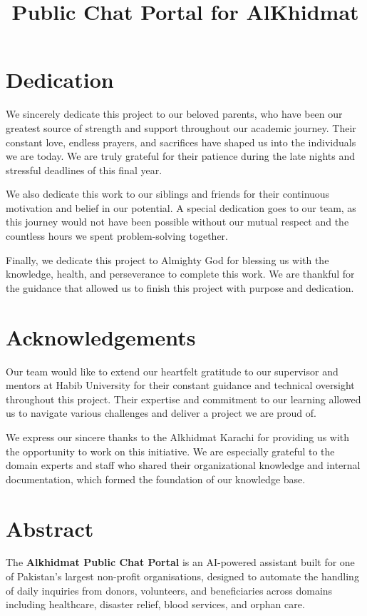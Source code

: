 \documentclass[12pt,twosided]{report}
\title{Public Chat Portal for AlKhidmat}
\begin{document}

\chapter*{Dedication}
We sincerely dedicate this project to our beloved parents, who have been our greatest source of strength and support throughout our academic journey. Their constant love, endless prayers, and sacrifices have shaped us into the individuals we are today. We are truly grateful for their patience during the late nights and stressful deadlines of this final year.

We also dedicate this work to our siblings and friends for their continuous motivation and belief in our potential. A special dedication goes to our team, as this journey would not have been possible without our mutual respect and the countless hours we spent problem-solving together.

Finally, we dedicate this project to Almighty God for blessing us with the knowledge, health, and perseverance to complete this work. We are thankful for the guidance that allowed us to finish this project with purpose and dedication.

\chapter*{Acknowledgements}
Our team would like to extend our heartfelt gratitude to our supervisor and mentors at Habib University for their constant guidance and technical oversight throughout this project. Their expertise and commitment to our learning allowed us to navigate various challenges and deliver a project we are proud of.

We express our sincere thanks to the Alkhidmat Karachi for providing us with the opportunity to work on this initiative. We are especially grateful to the domain experts and staff who shared their organizational knowledge and internal documentation, which formed the foundation of our knowledge base.

\chapter*{Abstract}

The \textbf{Alkhidmat Public Chat Portal} is an AI-powered assistant built for 
one of Pakistan's largest non-profit organisations, designed to automate the 
handling of daily inquiries from donors, volunteers, and beneficiaries across 
domains including healthcare, disaster relief, blood services, and orphan care.
\end{document}
